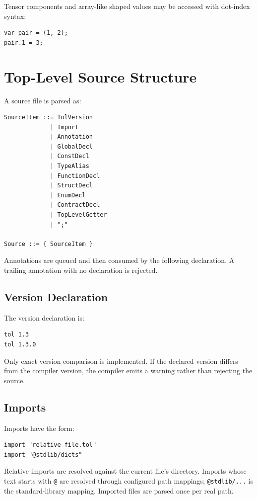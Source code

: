 \documentclass[12pt,oneside]{article}
\begin{document}
Tensor components and array-like shaped values may be accessed with dot-index
syntax:

\begin{verbatim}
var pair = (1, 2);
pair.1 = 3;
\end{verbatim}

\section{Top-Level Source Structure}
\label{sec:toplevel}
A source file is parsed as:

\begin{verbatim}
SourceItem ::= TolVersion
             | Import
             | Annotation
             | GlobalDecl
             | ConstDecl
             | TypeAlias
             | FunctionDecl
             | StructDecl
             | EnumDecl
             | ContractDecl
             | TopLevelGetter
             | ";"

Source ::= { SourceItem }
\end{verbatim}

Annotations are queued and then consumed by the following declaration. A
trailing annotation with no declaration is rejected.

\subsection{Version Declaration}
The version declaration is:

\begin{verbatim}
tol 1.3
tol 1.3.0
\end{verbatim}

Only exact version comparison is implemented. If the declared version differs
from the compiler version, the compiler emits a warning rather than rejecting
the source.

\subsection{Imports}
Imports have the form:

\begin{verbatim}
import "relative-file.tol"
import "@stdlib/dicts"
\end{verbatim}

Relative imports are resolved against the current file's directory. Imports
whose text starts with \verb|@| are resolved through configured path mappings;
\verb|@stdlib/...| is the standard-library mapping. Imported files are parsed
once per real path.
\end{document}
